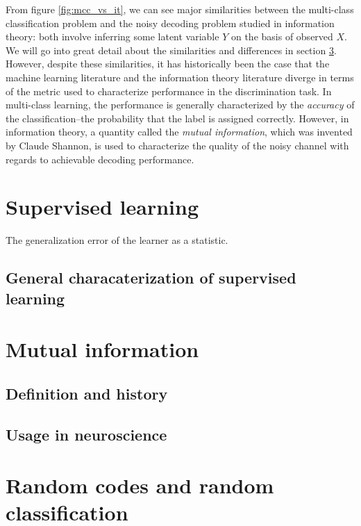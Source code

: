 From figure \ref{fig:mcc_vs_it}, we can see major similarities between
the multi-class classification problem and the noisy decoding problem
studied in information theory: both involve inferring some latent
variable $Y$ on the basis of observed $X$.  We will go into great
detail about the similarities and differences in section
\ref{sec:rand_code_rand_class}.  However, despite these similarities,
it has historically been the case that the machine learning literature
and the information theory literature diverge in terms of the metric
used to characterize performance in the discrimination task.  In
multi-class learning, the performance is generally characterized by
the \emph{accuracy} of the classification--the probability that the
label is assigned correctly.  However, in information theory, a
quantity called the \emph{mutual information}, which was invented by
Claude Shannon, is used to characterize the quality of the noisy
channel with regards to achievable decoding performance. %

\section{Supervised learning}

The generalization error of the learner as a statistic.

\subsection{General characaterization of supervised learning}

\section{Mutual information}

\subsection{Definition and history}

\subsection{Usage in neuroscience}


\section{Random codes and random classification}\label{sec:rand_code_rand_class}


